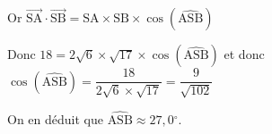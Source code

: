 \documentclass[10pt]{article}
\providecommand{\degres}{\ensuremath{^\circ}}
\providecommand{\vectt}[1]{\overrightarrow{\mathrm{#1}}}
\providecommand{\degres}{{^\circ}}
\begin{document}
\begin{enumerate}
\begin{enumerate}
Or $\vectt{SA}\cdot \vectt{SB} = \text{SA}\times \text{SB}\times \cos \left ( \widehat{\text{ASB}}\right )$

Donc $18 = 2\sqrt{6} \times \sqrt{17} \times \cos \left ( \widehat{\text{ASB}}\right )$
et donc
$\cos \left ( \widehat{\text{ASB}}\right ) = \dfrac{18}{2\sqrt{6} \times \sqrt{17}}
= \dfrac{9}{\sqrt{102}}$

On en déduit que $\widehat{\text{ASB}} \approx 27,0\degres$.

	\end{enumerate}
\end{enumerate}

\bigskip
\end{document}
